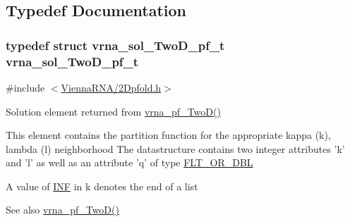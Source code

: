 \subsection{Typedef Documentation}
\hypertarget{group__kl__neighborhood__pf_ga5e449fbd695406aabd2bcabddc374621}{
\subsubsection[{vrna\+\_\+sol\+\_\+\+Two\+D\+\_\+pf\+\_\+t}]{\setlength{\rightskip}{0pt plus 5cm}typedef struct {\bf vrna\+\_\+sol\+\_\+\+Two\+D\+\_\+pf\+\_\+t}  {\bf vrna\+\_\+sol\+\_\+\+Two\+D\+\_\+pf\+\_\+t}}}\label{group__kl__neighborhood__pf_ga5e449fbd695406aabd2bcabddc374621}


{\ttfamily \#include $<$\hyperlink{2Dpfold_8h}{Vienna\+R\+N\+A/2\+Dpfold.\+h}$>$}



Solution element returned from \hyperlink{group__kl__neighborhood__pf_ga0bc3427689bd09da09b8b3094a27f836}{vrna\+\_\+pf\+\_\+\+Two\+D()} 

This element contains the partition function for the appropriate kappa (k), lambda (l) neighborhood The datastructure contains two integer attributes 'k' and 'l' as well as an attribute 'q' of type \hyperlink{group__data__structures_ga31125aeace516926bf7f251f759b6126}{F\+L\+T\+\_\+\+O\+R\+\_\+\+D\+B\+L}

A value of \hyperlink{energy__const_8h_a12c2040f25d8e3a7b9e1c2024c618cb6}{I\+N\+F} in k denotes the end of a list

\begin{DoxySeeAlso}{See also}
\hyperlink{group__kl__neighborhood__pf_ga0bc3427689bd09da09b8b3094a27f836}{vrna\+\_\+pf\+\_\+\+Two\+D()} 
\end{DoxySeeAlso}


